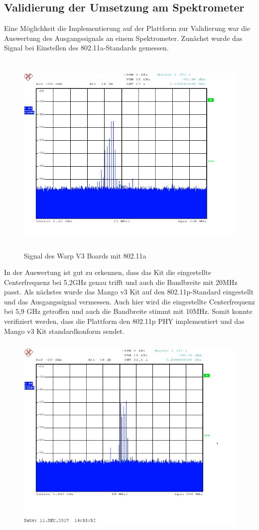 \documentclass[letterpaper,11pt]{article}
\begin{document}
\begin{onehalfspace}
\subsection{Validierung der Umsetzung am Spektrometer}
Eine Möglichkeit die Implementierung auf der Plattform zur Validierung war die Auswertung des Ausgangssignals an einem Spektrometer. Zunächst wurde das Signal bei Einstellen des 802.11a-Standards gemessen.
\begin{figure}[H]
\begin{center}
\includegraphics[width = 16cm,height=10cm]{80211a.jpg}
\caption{Signal des Warp V3 Boards mit 802.11a}
\label{fig6}
\end{center}
\end{figure}
\noindent In der Auswertung ist gut zu erkennen, dass das Kit die eingestellte Centerfrequenz bei 5,2GHz genau  trifft und auch die Bandbreite mit 20MHz passt. Als nächstes wurde das Mango v3 Kit auf den 802.11p-Standard eingestellt und das Ausgangssignal vermessen. Auch hier wird die eingestellte Centerfrequenz bei 5,9 GHz getroffen und auch die Bandbreite stimmt mit 10MHz. Somit konnte verifiziert werden, dass die Plattform den 802.11p PHY implementiert und das Mango v3 Kit standardkonform sendet. 
\begin{figure}[H]
\begin{center}
\includegraphics[width = 16cm,height=10cm]{80211p.jpg}

\end{center}
\end{figure}
\end{onehalfspace}
\end{document}
